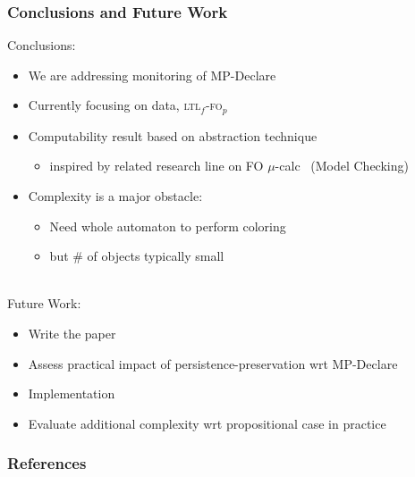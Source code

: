 \documentclass[xcolor=dvipsnames]{beamer}
\newcommand{\ltlf}{\textsc{ltl}$_f$\xspace}
\newcommand{\ltlffop}{\ltlf-\textsc{fo}$_p$\xspace}
\begin{document}

\begin{frame}
\frametitle{Conclusions and Future Work}

Conclusions:
\begin{itemize}
	\item We are addressing monitoring of MP-Declare
	\item Currently focusing on data, \ltlffop
	\item Computability result based on abstraction technique
		\begin{itemize}
			\item inspired by related research line on FO $\mu$-calc~\cite{} (Model Checking)
		\end{itemize}
	\item Complexity is a major obstacle: 
		\begin{itemize}
			\item Need whole automaton to perform coloring
			\item but \# of objects typically small
		\end{itemize}
\end{itemize}

~\\

Future Work:
	\begin{itemize}
		\item Write the paper \smiley
		\item Assess practical impact of persistence-preservation wrt MP-Declare
		\item Implementation
		\item Evaluate additional complexity wrt propositional case in practice
	\end{itemize}




\end{frame}


\begin{frame}[allowframebreaks]
\frametitle{References}
\normalsize{


}
\end{frame}

\end{document}
